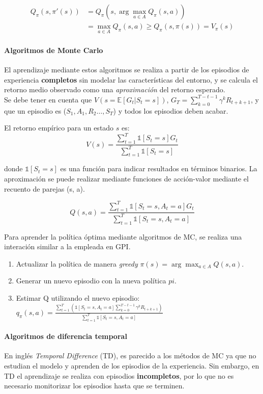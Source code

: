 \begin{equation*}
\begin{split}
   Q_\pi(s, \pi'(s)) & = Q_\pi(s, \arg \max_{a \in A} Q_\pi(s, a)) \\
   & = \max_{a \in A}Q_\pi(s, a) \geq Q_\pi (s, \pi(s)) = V_\pi(s)
\end{split}
\end{equation*}

\paragraph{Algoritmos de Monte Carlo} El aprendizaje mediante estos algoritmos se realiza a partir de los episodios de experiencia \textbf{completos} sin modelar las características del entorno, y se calcula el retorno medio observado como una \textit{aproximación} del retorno esperado. \\

Se debe tener en cuenta que $V(s = \mathbb{E}[G_t|S_t = s])$, $G_T = \sum_{k=0}^{T-t-1} \gamma^k R_{t+k+1}$, y que un episodio es ($S_1, A_1, R_2 \ldots, S_T$) y todos los episodios deben acabar.

El retorno empírico para un estado $s$ es:
\[V(s) = \frac{\sum_{t=1}^{T} \mathbb{1}[S_t = s]G_t}{\sum_{t=1}^{T} \mathbb{1}[S_t = s]}\]

donde $\mathbb{1}[S_t = s]$ es una función para indicar resultados en términos binarios. La aproximación se puede realizar mediante funciones de acción-valor mediante el recuento de parejas (s, a).

\[Q(s, a) = \frac{\sum_{t=1}^{T} \mathbb{1}[S_t = s, A_t = a]G_t}{\sum_{t=1}^{T} \mathbb{1}[S_t = s, A_t=a]}\]

Para aprender la política óptima mediante algoritmos de MC, se realiza una interación similar a la empleada en GPI.

\begin{enumerate}
    \item Actualizar la política de manera \textit{greedy} $\pi(s) = \arg \max_{a \in A} Q(s, a)$.
    \item Generar un nuevo episodio con la nueva política $pi$.
    \item Estimar Q utilizando el nuevo episodio: $q_\pi(s, a)= \frac{\sum_{t=1}^{T} (\mathbb{1}[S_t=s, A_t=a] \sum_{k=0}^{T-t-1} \gamma^{k} R_{t+k+1})}{\sum_{t=1}^{T} \mathbb{1}[S_t=s, A_t = a]}$
\end{enumerate}

\paragraph{Algoritmos de diferencia temporal} En inglés \textit{Temporal Difference} (TD), es parecido a los métodos de MC ya que no estudian el modelo y aprenden de los episodios de la experiencia. Sin embargo, en TD el aprendizaje se realiza con episodios \textbf{incompletos}, por lo que no es necesario monitorizar los episodios hasta que se terminen. \\

